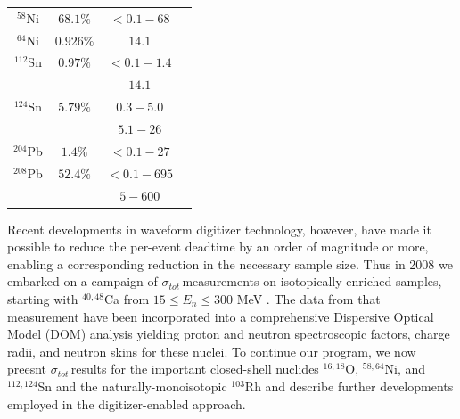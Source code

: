 \documentclass[twocolumn,secnumarabic,amssymb, nobibnotes, aps, prl,
superscriptaddress, nobalancelastpage]{revtex4}
\newcommand{\tots}{\ensuremath{\sigma_{tot}}\,}
\begin{document}
\begin{table}[ht]
\begin{center}
\begin{tabular}{ c c c c }
            $^{58}$Ni & $68.1\%$ & $<0.1-68$ & \cite{Perey1993}\\

            $^{64}$Ni & $0.926\%$ & $14.1$ & \cite{Dukarevich1967}\\

            $^{112}$Sn & $0.97\%$ & $<0.1-1.4$ & \cite{Timokhov1989}\\
            & & $14.1$ & \cite{Dukarevich1967}\\

            $^{124}$Sn & $5.79\%$ & $0.3-5.0$ & \cite{Harper1982}\\
            & & $5.1-26$ & \cite{Rapaport1980}\\

            $^{204}$Pb & $1.4\%$ & $<0.1-27$ & \cite{Carlton2003}\\

            $^{208}$Pb & $52.4\%$ & $<0.1 - 695$ & \cite{Harvey1999}\\
            & & $5-600$ & \cite{Finlay1993}\\

            \hline
        \end{tabular}
    \end{center}
\end{table}

Recent developments in waveform digitizer technology, however, have made it
possible to reduce the per-event deadtime by an order of magnitude or more,
enabling a corresponding reduction in the necessary sample size. Thus in 2008 we
embarked on a campaign of \tots measurements on isotopically-enriched samples,
starting with $^{40,48}$Ca from $15 \leq E_{n} \leq 300$ MeV \cite{Shane2010}.
The data from that measurement have been incorporated into a comprehensive
Dispersive Optical Model (DOM) analysis \cite{Mueller2011, Mahzoon2014,
MahzoonPhDThesis} yielding proton and neutron spectroscopic factors, charge
radii, and neutron skins \cite{Mahzoon2017} for these nuclei. To continue our
program, we now preesnt \tots results for the important closed-shell nuclides
$^{16,18}$O, $^{58,64}$Ni, and $^{112,124}$Sn and the naturally-monoisotopic
$^{103}$Rh and describe further developments employed in the digitizer-enabled
approach.
\end{document}
